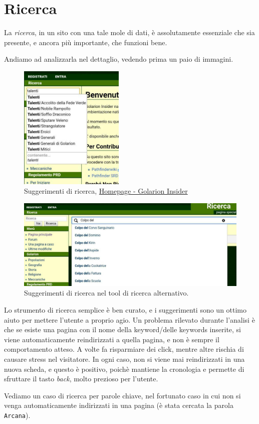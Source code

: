 \section{Ricerca}

La \emph{ricerca}, in un sito con una tale mole di dati, è assolutamente essenziale che sia 
presente, e ancora più importante, che funzioni bene.

Andiamo ad analizzarla nel dettaglio, vedendo prima un paio di immagini.

\begin{figure}[hbt]
    \centering
    \includegraphics[width=5cm]{img/ricerca1.jpg}
    \caption{Suggerimenti di ricerca, \href{http://golarion.altervista.org/wiki/Pagina_principale}{Homepage - Golarion Insider}}
\end{figure}

\begin{figure}[hbt]
    \centering
    \includegraphics[width=\textwidth]{img/ricerca2.jpg}
    \caption{Suggerimenti di ricerca nel tool di ricerca alternativo.}
\end{figure}

Lo strumento di ricerca semplice è ben curato, e i suggerimenti sono un ottimo aiuto per mettere l'utente a proprio agio.
Un problema rilevato durante l'analisi è che se esiste una pagina con il nome della keyword/delle keywords inserite,
si viene automaticamente reindirizzati a quella pagina, e non è sempre il comportamento atteso. A volte fa risparmiare dei click,
mentre altre rischia di causare stress nel visitatore. In ogni caso, non si viene mai reindirizzati in una nuova scheda, e questo
è positivo, poichè mantiene la cronologia e permette di sfruttare il tasto \emph{back}, molto prezioso per l'utente.\par
\smallskip
Vediamo un caso di ricerca per parole chiave, nel fortunato caso in cui non si venga automaticamente indirizzati in
una pagina (è stata cercata la parola \texttt{Arcana}).

